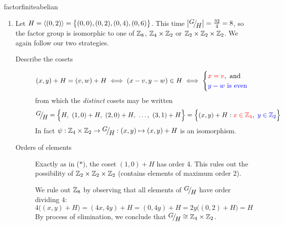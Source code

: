 \begin{examples}{}{factorfiniteabelian}
\begin{enumerate}
			 
	  \item Let $H=\left\langle (0,2)\right\rangle=\bigl\{(0,0),(0,2),(0,4),(0,6)\bigr\}$. This time $\nm{\quotient GH}=\frac{32}4=8$, so the factor group is isomorphic to one of $\mathbb{Z}_8$, $\mathbb{Z}_4\times\mathbb{Z}_2$ or $\mathbb{Z}_2\times\mathbb{Z}_2\times\mathbb{Z}_2$. We again follow our two strategies.
	  \begin{description}
		  \item[Describe the cosets]
			\[
				(x,y)+H=(v,w)+H\iff (x-v,y-w)\in H\iff 
				\begin{cases}
					\textcolor{red}{x=v},\text{ and}\\
					\textcolor{blue}{y-w\text{ is even}}
				\end{cases}
			\]
			from which the \emph{distinct} cosets may be written
			\[
				\quotient GH=\Bigl\{H,\ (1,0)+H,\ (2,0)+H,\ \ldots,\ (3,1)+H\Bigr\} =\Bigl\{(x,y)+H: \textcolor{red}{x\in\Z_4},\ \textcolor{blue}{y\in\Z_2}\Bigr\}
			\]
			In fact $\psi:\Z_4\times\Z_2\to\quotient GH:(x,y)\mapsto (x,y)+H$ is an isomorphism.
			\item[Orders of elements] Exactly as in ($\ast$), the coset $(1,0)+H$ has order 4. This rules out the possibility of $\mathbb{Z}_2\times\mathbb{Z}_2\times\mathbb{Z}_2$ (contains elements of maximum order 2).\par
	  	We rule out $\mathbb{Z}_8$ by observing that all elements of $\quotient GH$ have order dividing 4:
	  	\[
	  		4\bigl((x,y)+H\bigr)
	  		=(4x,4y)+H
	  		=(0,4y)+H
	  		=2y\bigl((0,2)+H\bigr)
	  		=H
	  	\]
			By process of elimination, we conclude that $\quotient GH\cong\Z_4\times\Z_2$.
	  \end{description}


		\goodbreak
	

\end{enumerate}
\end{examples}
